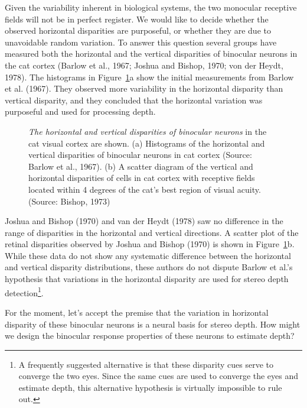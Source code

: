 Given the variability inherent in biological systems,
the two monocular receptive fields will not be in perfect register.
We would like to decide whether the observed
horizontal disparities are purposeful,
or whether they are due to unavoidable random variation.
To answer this question several groups have
measured both the horizontal and the vertical disparities
of binocular neurons in the cat cortex (Barlow et al., 1967;
Joshua and Bishop, 1970; von der Heydt, 1978).
The histograms in Figure~\ref{f5:neuralDisparity}a show
the initial measurements from
Barlow et al. (1967).
They observed more variability in the horizontal
disparity than vertical disparity, and they
concluded that the horizontal variation was purposeful
and used for processing depth.
\begin{figure}
\centerline{
}
\caption[Neural disparities in cat]{
{\em The horizontal and vertical disparities of binocular neurons} 
in the cat visual cortex are shown.
(a) Histograms of the horizontal and vertical disparities of
binocular neurons in cat cortex (Source: Barlow  et al., 1967).
(b) A scatter diagram of the vertical and horizontal disparities
of cells in cat cortex with
receptive fields located
within 4 degrees of the cat's best region
of visual acuity.
(Source: Bishop, 1973)
}
\label{f5:neuralDisparity}
\end{figure}
Joshua and Bishop (1970) and van der Heydt (1978)
saw no difference in the range of disparities
in the horizontal and vertical directions.
A scatter plot of the retinal disparities observed
by Joshua and Bishop (1970) is shown in Figure~\ref{f5:neuralDisparity}b.
While these data do not show any systematic difference
between the horizontal and vertical disparity distributions,
these authors do not dispute Barlow et al.'s hypothesis that
variations in the horizontal disparity are used for
stereo depth detection\footnote{
A frequently suggested alternative 
is that these disparity cues
serve to converge the two eyes.
Since the same cues are used to converge the eyes and
estimate depth, this alternative hypothesis is virtually
impossible to rule out.}.

For the moment, let's accept the premise that the
variation in horizontal disparity of these binocular neurons
is a neural basis for stereo depth.
How might we design the binocular response properties of these
neurons to estimate depth?

